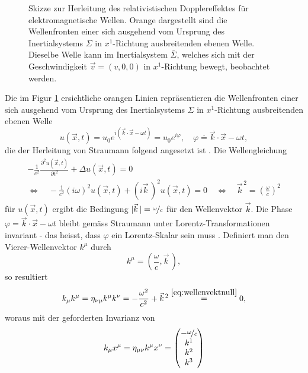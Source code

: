 \documentclass[a4paper,12pt]{article}
\numberwithin{equation}{section}
\begin{document}
\begin{figure}[h]
\begin{tikzpicture}[x=0.75pt,y=0.75pt,yscale=-1,xscale=1]
\end{tikzpicture}

\caption{Skizze zur Herleitung des relativistischen Dopplereffektes für elektromagnetische Wellen. Orange dargestellt sind die Wellenfronten einer sich ausgehend vom Ursprung des Inertialsystems $\Sigma$ in $x^1$-Richtung ausbreitenden ebenen Welle. Dieselbe Welle kann im Inertialsystem $\bar{\Sigma}$, welches sich mit der Geschwindigkeit $\vec{v}=(v,0,0)$ in $x^1$-Richtung bewegt, beobachtet werden.}
\label{fig:herlDopplerrel}
\end{figure}
Die im Figur \ref{fig:herlDopplerrel} ersichtliche orangen Linien repräsentieren die Wellenfronten einer sich ausgehend vom Ursprung des Inertialsystems $\Sigma$ in $x^1$-Richtung ausbreitenden ebenen Welle \begin{equation}
u(\vec{x},t) = u_0 e^{i(\vec{k}\cdot\vec{x}-\omega t)} = u_0 e^{i\varphi}, \quad \varphi \doteq \vec{k}\cdot \vec{x}-\omega t,
\end{equation} die der Herleitung von Straumann folgend angesetzt ist \cite[S.35]{Straumann.2013}. Die Wellengleichung \begin{gather}
-\frac{1}{c^2}\frac{\partial^2 u(\vec{x},t)}{\partial t^2} + \Delta u(\vec{x},t) = 0 \\
\Leftrightarrow \quad -\frac{1}{c^2}(i\omega)^2u(\vec{x},t) + (i\vec{k}\,)^2u(\vec{x},t)=0 \quad  \Leftrightarrow \quad  \vec{k}^{\,2} = \left(\frac{\omega}{c}\right)^2 \label{eq:wellenvektnull}
\end{gather}für $u(\vec{x},t)$ ergibt die Bedingung $|\vec{k}\,| = \nicefrac{\omega}{c}$ für den Wellenvektor $\vec{k}$. Die Phase $\varphi = \vec{k}\cdot\vec{x}-\omega t$ bleibt gemäss Straumann unter Lorentz-Transformationen invariant - das heisst, dass $\varphi$ ein Lorentz-Skalar sein muss \cite[S.35]{Straumann.2013}. Definiert man den Vierer-Wellenvektor $k^\mu$ durch \begin{equation}
k^\mu = \left(\frac{\omega}{c},\vec{k}\,\right),
\end{equation} so resultiert \begin{equation}
k_\mu k^\mu = \eta_{\nu \mu} k^\mu k^\nu = -\frac{\omega^2}{c^2}+ \vec{k}^{\,2} \overset{\eqref{eq:wellenvektnull}}{=} 0,
\end{equation} woraus mit der geforderten Invarianz von \begin{equation}
k_\mu x^\mu = \eta_{\mu \nu}k^\mu x^\nu = \begin{pmatrix}
-\nicefrac{\omega}{c} \\ k^1 \\ k^2 \\ k^3

\end{pmatrix}
\end{equation}
\end{document}
